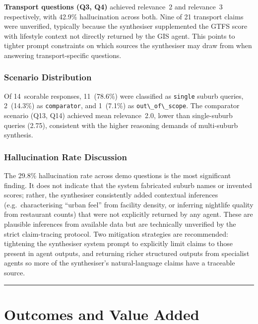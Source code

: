 \documentclass[11pt,a4paper]{article}
\newcommand{\passthrough}[1]{#1}
\begin{document}
\textbf{Transport questions (Q3, Q4)} achieved relevance~2 and relevance~3 respectively, with 42.9\% hallucination across both. Nine of 21 transport claims were unverified, typically because the synthesiser supplemented the GTFS score with lifestyle context not directly returned by the GIS agent. This points to tighter prompt constraints on which sources the synthesiser may draw from when answering transport-specific questions.

\subsubsection{Scenario Distribution}

Of 14~scorable responses, 11~(78.6\%) were classified as \passthrough{\lstinline!single!} suburb queries, 2~(14.3\%) as \passthrough{\lstinline!comparator!}, and 1~(7.1\%) as \passthrough{\lstinline!out\_of\_scope!}. The comparator scenario (Q13, Q14) achieved mean relevance~2.0, lower than single-suburb queries (2.75), consistent with the higher reasoning demands of multi-suburb synthesis.

\subsubsection{Hallucination Rate Discussion}

The 29.8\% hallucination rate across demo questions is the most significant finding. It does not indicate that the system fabricated suburb names or invented scores; rather, the synthesiser consistently added contextual inferences (e.g.\ characterising ``urban feel'' from facility density, or inferring nightlife quality from restaurant counts) that were not explicitly returned by any agent. These are plausible inferences from available data but are technically unverified by the strict claim-tracing protocol. Two mitigation strategies are recommended: tightening the synthesiser system prompt to explicitly limit claims to those present in agent outputs, and returning richer structured outputs from specialist agents so more of the synthesiser's natural-language claims have a traceable source.

\begin{center}\rule{0.5\linewidth}{0.5pt}\end{center}

\section{Outcomes and Value Added}\label{7-outcomes-and-value-added}
\end{document}
